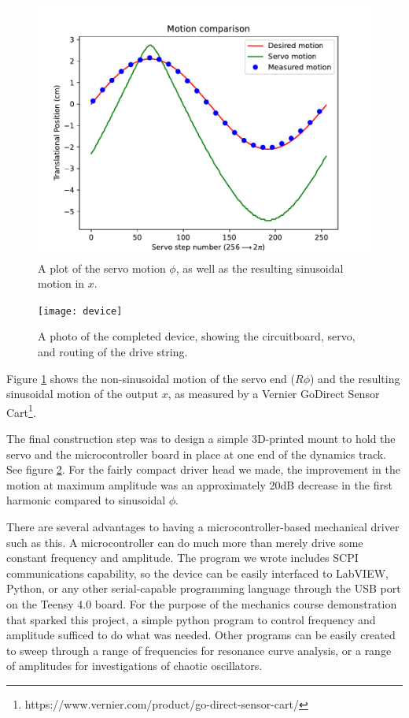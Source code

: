\documentclass[11 pt]{article}
\begin{document}
\begin{figure}[ht]
	\begin{center}
		\includegraphics{comparison}
	\end{center}
	\caption{A plot of the servo motion $\phi$, as well as the resulting sinusoidal motion in $x$.}
	\label{fig:motion}
\end{figure}

\begin{figure}[ht]
	\begin{center}
		\texttt{[image: device]}
	\end{center}
	\caption{A photo of the completed device, showing the circuitboard, servo, and routing of the drive string.}
	\label{fig:device}
\end{figure}

Figure \ref{fig:motion} shows the non-sinusoidal motion of the servo end ($R\phi$) and the resulting sinusoidal motion of the output $x$, as measured by a Vernier GoDirect Sensor Cart\footnote{https://www.vernier.com/product/go-direct-sensor-cart/}.

The final construction step was to design a simple 3D-printed mount to hold the servo and the microcontroller board in place at one end of the dynamics track. 
See figure \ref{fig:device}.
For the fairly compact driver head we made, the improvement in the motion at maximum amplitude was an approximately 20dB decrease in the first harmonic compared to sinusoidal $\phi$.

There are several advantages to having a microcontroller-based mechanical driver such as this. 
A microcontroller can do much more than merely drive some constant frequency and amplitude. 
The program we wrote includes SCPI communications capability, so the device can be easily interfaced to LabVIEW, Python, or any other serial-capable programming language through the USB port on the Teensy 4.0 board.
For the purpose of the mechanics course demonstration that sparked this project, a simple python program to control frequency and amplitude sufficed to do what was needed. Other programs can be easily created to sweep through a range of frequencies for resonance curve analysis, or a range of amplitudes for investigations of chaotic oscillators.
\end{document}
